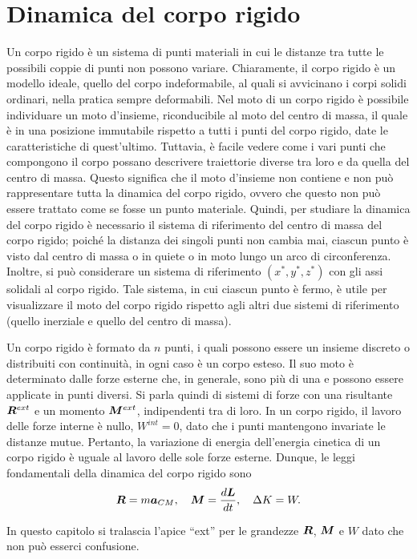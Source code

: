 \chapter{Dinamica del corpo rigido}
Un corpo rigido è un sistema di punti materiali in cui le distanze tra tutte le possibili coppie di punti non possono variare. Chiaramente, il corpo rigido è un modello ideale, quello del corpo indeformabile, al quali si avvicinano i corpi solidi ordinari, nella pratica sempre deformabili. Nel moto di un corpo rigido è possibile individuare un moto d'insieme, riconducibile al moto del centro di massa, il quale è in una posizione immutabile rispetto a tutti i punti del corpo rigido, date le caratteristiche di quest'ultimo. Tuttavia, è facile vedere come i vari punti che compongono il corpo possano descrivere traiettorie diverse tra loro e da quella del centro di massa. Questo significa che il moto d'insieme non contiene e non può rappresentare tutta la dinamica del corpo rigido, ovvero che questo non può essere trattato come se fosse un punto materiale. Quindi, per studiare la dinamica del corpo rigido è necessario il sistema di riferimento del centro di massa del corpo rigido; poiché la distanza dei singoli punti non cambia mai, ciascun punto è visto dal centro di massa o in quiete o in moto lungo un arco di circonferenza. Inoltre, si può considerare un sistema di riferimento $(x^*,y^*,z^*)$ con gli assi solidali al corpo rigido. Tale sistema, in cui ciascun punto è fermo, è utile per visualizzare il moto del corpo rigido rispetto agli altri due sistemi di riferimento (quello inerziale e quello del centro di massa). 

Un corpo rigido è formato da $n$ punti, i quali possono essere un insieme discreto o distribuiti con continuità, in ogni caso è un corpo esteso. Il suo moto è determinato dalle forze esterne che, in generale, sono più di una e possono essere applicate in punti diversi. Si parla quindi di sistemi di forze con una risultante $\bm{R}^{ext}$ e un momento $\bm{M}^{ext}$, indipendenti tra di loro. In un corpo rigido, il lavoro delle forze interne è nullo, $W^{int}=0$, dato che i punti mantengono invariate le distanze mutue. Pertanto, la variazione di energia dell'energia cinetica di un corpo rigido è uguale al lavoro delle sole forze esterne. Dunque, le leggi fondamentali della dinamica del corpo rigido sono
\begin{equation}
    \bm{R}=m\bm{a}_{CM},\quad\bm{M}=\frac{d\bm{L}}{dt},\quad\Delta K=W.
\end{equation}
\begin{notz}
    In questo capitolo si tralascia l'apice ``ext'' per le grandezze $\bm{R}$, $\bm{M}$ e $W$ dato che non può esserci confusione. 
\end{notz}

